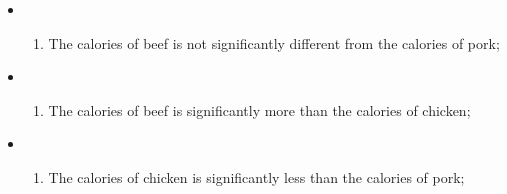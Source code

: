 \documentclass[11pt]{article}
\providecommand{\tightlist}{%
      \setlength{\itemsep}{0pt}\setlength{\parskip}{0pt}}
\begin{document}
\begin{itemize}
\item
  \begin{enumerate}
  \def\labelenumi{\arabic{enumi}.}
  \tightlist
  \item
    The calories of beef is not significantly different from the
    calories of pork;
  \end{enumerate}
\item
  \begin{enumerate}
  \def\labelenumi{\arabic{enumi}.}
  \setcounter{enumi}{1}
  \tightlist
  \item
    The calories of beef is significantly more than the calories of
    chicken;
  \end{enumerate}
\item
  \begin{enumerate}
  \def\labelenumi{\arabic{enumi}.}
  \setcounter{enumi}{2}
  \tightlist
  \item
    The calories of chicken is significantly less than the calories of
    pork;
  \end{enumerate}
\end{itemize}


    
    
    
    
\end{document}
